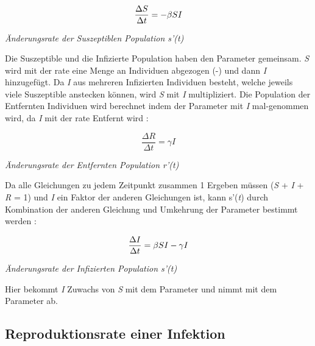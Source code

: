 \documentclass[12pt]{scrartcl} %
\begin{document}
$$ \frac{\Delta S}{\Delta t} = -\beta\space S I $$
\begin{center}
\textsl{Änderungsrate der Suszeptiblen Population s'(\textit{t})}
\end{center}

Die Suszeptible und die Infizierte Population haben den Parameter \textbeta \space gemeinsam. \textit{S} wird mit der rate \textbeta \space eine Menge an Individuen abgezogen (-\textbeta) und dann \textit{I} hinzugefügt. Da \textit{I} aus mehreren Infizierten Individuen besteht, welche jeweils \textbeta\space viele Suszeptible anstecken können, wird \textbeta\textit{S} mit \textit{I} multipliziert.
Die Population der Entfernten Individuen wird berechnet indem der Parameter \textgamma\space mit \textit{I} mal-genommen wird, da \textit{I} mit der rate \textgamma\space Entfernt wird \cite{7,3}:

$$ \frac{\Delta R}{\Delta t} = \gamma I $$
\begin{center}
\textsl{Änderungsrate der Entfernten Population r'(\textit{t})}
\end{center}


Da alle Gleichungen zu jedem Zeitpunkt zusammen 1 Ergeben müssen (\textit{S} + \textit{I} + \textit{R} = 1) und \textit{I} ein Faktor der anderen Gleichungen ist, kann s'(\textit{t}) durch Kombination der anderen Gleichung und Umkehrung der Parameter bestimmt werden
 \cite{3, 4}:

$$ \frac{\Delta I}{\Delta t} = \beta\space S I - \gamma I $$
\begin{center}
\textsl{Änderungsrate der Infizierten Population s'(\textit{t})}
\end{center}

Hier bekommt \textit{I} Zuwachs von \textit{S} mit dem Parameter \textbeta\space und nimmt mit dem Parameter \textgamma\space ab.


\subsection{Reproduktionsrate einer Infektion}
\end{document}
